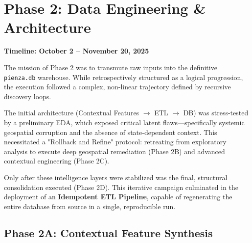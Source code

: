 \section{Phase 2: Data Engineering \& Architecture}

\noindent \textbf{Timeline: October 2 -- November 20, 2025}

The mission of Phase 2 was to transmute raw inputs into the definitive \texttt{pienza.db} warehouse. While retrospectively structured as a logical progression, the execution followed a complex, non-linear trajectory defined by recursive discovery loops.

The initial architecture (Contextual Features $\to$ ETL $\to$ DB) was stress-tested by a preliminary EDA, which exposed critical latent flaws—specifically systemic geospatial corruption and the absence of state-dependent context. This necessitated a "Rollback and Refine" protocol: retreating from exploratory analysis to execute deep geospatial remediation (Phase 2B) and advanced contextual engineering (Phase 2C). 

Only after these intelligence layers were stabilized was the final, structural consolidation executed (Phase 2D). This iterative campaign culminated in the deployment of an \textbf{Idempotent ETL Pipeline}, capable of regenerating the entire database from source in a single, reproducible run.

\subsection{Phase 2A: Contextual Feature Synthesis}


